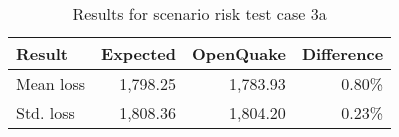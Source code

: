 \begin{table}[htbp]

\centering
\begin{tabular}{ l r r r }

\hline
\rowcolor{anti-flashwhite}
\bf{Result} & \bf{Expected} & \bf{OpenQuake} & \bf{Difference}\\
\hline
Mean loss & 1,798.25 & 1,783.93 & 0.80\% \\
Std. loss & 1,808.36 & 1,804.20 & 0.23\% \\
\hline
\end{tabular}

\caption{Results for scenario risk test case 3a}
\label{tab:result-scenario-risk-3a}
\end{table}